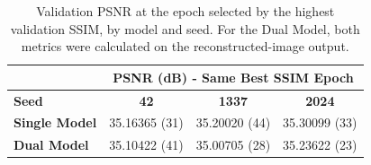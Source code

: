\begin{table}[!htbp]
\centering

\begin{tabular}{lccc}
\hline
 & \multicolumn{3}{c}{\textbf{PSNR (dB) - Same Best SSIM Epoch }} \\
\hline
\textbf{Seed} & \textbf{42} & \textbf{1337} & \textbf{2024} \\
\hline
\textbf{Single Model} & 35.16365 (31) & 35.20020 (44) & 35.30099 (33) \\
\textbf{Dual Model} & 35.10422 (41) & 35.00705 (28) & 35.23622 (23) \\
\hline
\end{tabular}
\par\smallskip
\captionsetup{skip=2pt}
\caption[Validation PSNR at best validation SSIM]{Validation PSNR at the epoch selected by the highest validation SSIM, by model and seed. For the Dual Model, both metrics were calculated on the reconstructed-image output.}
\label{tab:best-validation-psnr}
\end{table}
